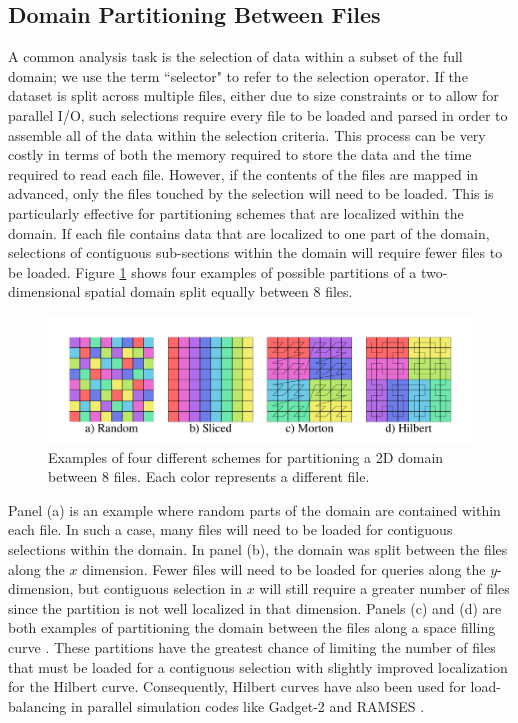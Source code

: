\documentclass[apjl]{emulateapj}
\begin{document}
\subsection{Domain Partitioning Between Files}\label{SS:decomp}
A common analysis task is the selection of data within a subset of the full domain; we use the term ``selector" to refer to the selection operator. If the dataset is split across multiple files, either due to size constraints or to allow for parallel I/O, such selections require every file to be loaded and parsed in order to assemble all of the data within the selection criteria. This process can be very costly in terms of both the memory required to store the data and the time required to read each file. However, if the contents of the files are mapped in advanced, only the files touched by the selection will need to be loaded. This is particularly effective for partitioning schemes that are localized within the domain. If each file contains data that are localized to one part of the domain, selections of contiguous sub-sections within the domain will require fewer files to be loaded. Figure \ref{fig:files} shows four examples of possible partitions of a two-dimensional spatial domain split equally between 8 files. 
%
\ifinclfig
	\begin{figure}[htbp]
	\begin{center}
	\includegraphics[width=\columnwidth,keepaspectratio]{../images/files.png}
	\caption{Examples of four different schemes for partitioning a 2D domain between 8 files. Each 	color represents a different file.}
	\label{fig:files}
	\end{center}
	\end{figure}
\fi
%

Panel (a) is an example where random parts of the domain are contained within each file. In such a case, many files will need to be loaded for contiguous selections within the domain. In panel (b), the domain was split between the files along the $x$ dimension. Fewer files will need to be loaded for queries along the $y$-dimension, but contiguous selection in $x$ will still require a greater number of files since the partition is not well localized in that dimension. Panels (c) and (d) are both examples of partitioning the domain between the files along a space filling curve \citep[Morton and Hilbert curves respectively;][]{Morton1996,Hilbert1970}. These partitions have the greatest chance of limiting the number of files that must be loaded for a contiguous selection with slightly improved localization for the Hilbert curve. Consequently, Hilbert curves have also been used for load-balancing in parallel simulation codes like {\sc Gadget-2} \citep{Springel2005b} and RAMSES \citep{Teyssier2001}.
\end{document}
